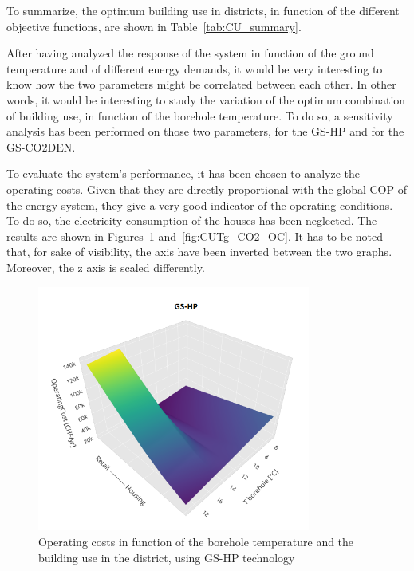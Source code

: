 \documentclass{article}
\begin{document}


To summarize, the optimum building use in districts, in function of the different objective functions, are shown in Table~\ref{tab:CU_summary}.



After having analyzed the response of the system in function of the ground temperature and of different energy demands, it would be very interesting to know how the two parameters might be correlated between each other. In other words, it would be interesting to study the variation of the optimum combination of building use, in function of the borehole temperature. 
To do so, a sensitivity analysis has been performed on those two parameters, for the GS-HP and for the GS-CO2DEN. 

To evaluate the system's performance, it has been chosen to analyze the operating costs. Given that they are directly proportional with the global COP of the energy system, they give a very good indicator of the operating conditions. To do so, the electricity consumption of the houses has been neglected. The results are shown in Figures~\ref{fig:CUTg_OC} and~\ref{fig:CUTg_CO2_OC}. It has to be noted that, for sake of visibility, the axis have been inverted between the two graphs. Moreover, the z axis is scaled differently.\\

\begin{figure}[htp]
	\centering
	\includegraphics[width=0.8\textwidth]{CUTg_SA_OC.png}
	\caption{Operating costs in function of the borehole temperature and the building use in the district, using GS-HP technology}
	\label{fig:CUTg_OC}
\end{figure}
\end{document}

